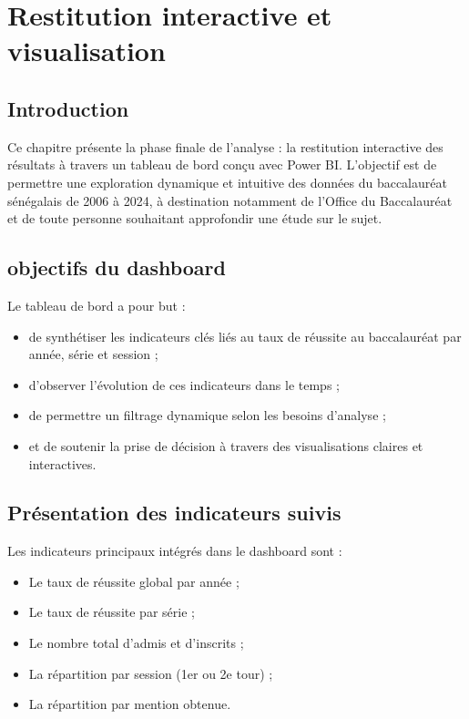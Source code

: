 \chapter{Restitution interactive et visualisation}

\section{Introduction}

Ce chapitre présente la phase finale de l’analyse : la restitution interactive des résultats à travers un tableau de bord conçu avec Power BI. 
L’objectif est de permettre une exploration dynamique et intuitive des données du baccalauréat sénégalais de 2006 à 2024, 
à destination notamment de l’Office du Baccalauréat et de toute personne souhaitant approfondir une étude sur le sujet.

\section{objectifs du dashboard}

Le tableau de bord a pour but :

\begin{itemize}
    \item de synthétiser les indicateurs clés liés au taux de réussite au baccalauréat par année, série et session ;
    \item d’observer l’évolution de ces indicateurs dans le temps ;
    \item de permettre un filtrage dynamique selon les besoins d’analyse ;
    \item et de soutenir la prise de décision à travers des visualisations claires et interactives.
\end{itemize}

\section{Présentation des indicateurs suivis}

Les indicateurs principaux intégrés dans le dashboard sont :
\begin{itemize}
    \item Le taux de réussite global par année ;
    \item Le taux de réussite par série ;
    \item Le nombre total d’admis et d’inscrits ;
    \item La répartition par session (1er ou 2e tour) ;
    \item La répartition par mention obtenue.
\end{itemize}

